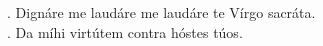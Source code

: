 \Vbar. Dignáre me laudáre me laudáre te Vírgo sacráta. \\
\Rbar. Da míhi virtútem contra hóstes túos.
